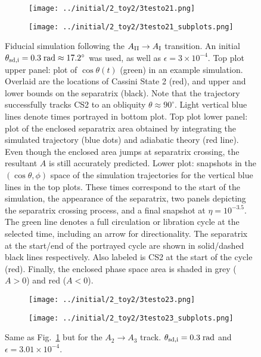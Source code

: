 \documentclass[
        fleqn,
        usenatbib,
        referee,
    ]{mnras}
\newcommand*{\p}[1]{\left(#1\right)}
\begin{document}
\begin{figure}
    \centering
    \begin{subfigure}{\columnwidth}
        \centering
        \texttt{[image: ../initial/2\_toy2/3testo21.png]}
    \end{subfigure}
    \begin{subfigure}{\columnwidth}
        \centering
        \texttt{[image: ../initial/2\_toy2/3testo21\_subplots.png]}
    \end{subfigure}
    \caption{Fiducial simulation following the $A_{\rm II} \to A_{\rm I}$
    transition. An initial $\theta_{\rm sd, i} = 0.3\;\mathrm{rad} \approx
    17.2^\circ$ was used, as well as $\epsilon = 3 \times 10^{-4}$. Top plot
    upper panel: plot of $\cos \theta(t)$ (green) in an example simulation.
    Overlaid are the locations of Cassini State 2 (red), and upper and lower
    bounds on the separatrix (black). Note that the trajectory successfully
    tracks CS2 to an obliquity $\theta \approx 90^\circ$. Light vertical blue
    lines denote times portrayed in bottom plot. Top plot lower panel: plot of
    the enclosed separatrix area obtained by integrating the simulated
    trajectory (blue dots) and adiabatic theory (red line). Even though the
    enclosed area jumps at separatrix crossing, the resultant $A$ is still
    accurately predicted. Lower plot: snapshots in the $\p{\cos \theta, \phi}$
    space of the simulation trajectories for the vertical blue lines in the top
    plots. These times correspond to the start of the simulation, the appearance
    of the separatrix, two panels depicting the separatrix crossing process, and
    a final snapshot at $\eta = 10^{-3.5}$. The green line denotes a full
    circulation or libration cycle at the selected time, including an arrow for
    directionality. The separatrix at the start/end of the portrayed cycle are
    shown in solid/dashed black lines respectively. Also labeled is CS2 at the
    start of the cycle (red). Finally, the enclosed phase space area is shaded
    in grey ($A > 0$) and red ($A < 0$).}\label{fig:ad_21}
\end{figure}
\begin{figure}
    \centering
    \begin{subfigure}{\columnwidth}
        \centering
        \texttt{[image: ../initial/2\_toy2/3testo23.png]}
    \end{subfigure}
    \begin{subfigure}{\columnwidth}
        \centering
        \texttt{[image: ../initial/2\_toy2/3testo23\_subplots.png]}
    \end{subfigure}
    \caption{Same as Fig.~\ref{fig:ad_21} but for the $A_2 \to A_3$ track.
    $\theta_{\rm sd, i} = 0.3\;\mathrm{rad}$ and $\epsilon = 3.01 \times
    10^{-4}$.}\label{fig:ad_23}
\end{figure}
\end{document}
